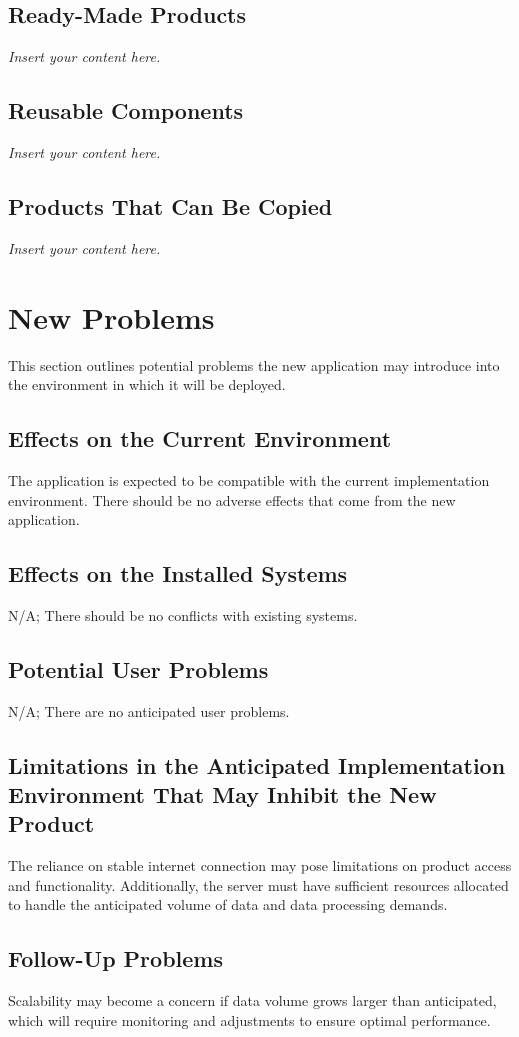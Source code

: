 \documentclass[12pt]{article}
\newcommand{\lips}{\textit{Insert your content here.}}
\begin{document}
\subsection{Ready-Made Products}
\lips
\subsection{Reusable Components}
\lips
\subsection{Products That Can Be Copied}
\lips

\section{New Problems}
This section outlines potential problems the new application may introduce into the  environment in which it will be deployed.
\subsection{Effects on the Current Environment}
The application is expected to be compatible with the current implementation environment. There should be no adverse effects that come from the new application.

\subsection{Effects on the Installed Systems}
N/A; There should be no conflicts with existing systems.

\subsection{Potential User Problems}
N/A; There are no anticipated user problems.

\subsection{Limitations in the Anticipated Implementation Environment That May
Inhibit the New Product}
The reliance on stable internet connection may pose limitations on product access and functionality. Additionally, the server must have sufficient resources allocated to handle the anticipated volume of data and data processing demands.

\subsection{Follow-Up Problems}
Scalability may become a concern if data volume grows larger than anticipated, which will require monitoring and adjustments to ensure optimal performance.
\end{document}
